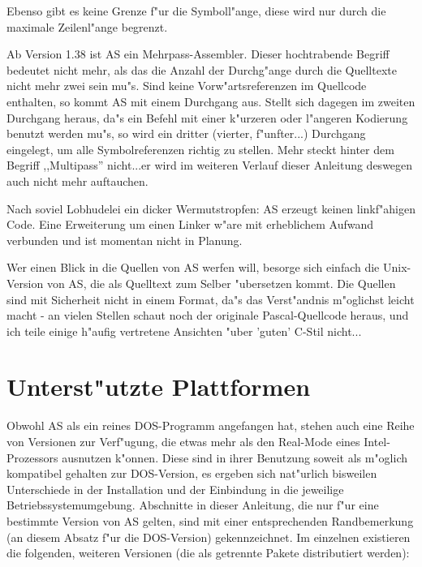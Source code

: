 \documentclass[12pt,a4paper,twoside]{report}
\begin{document}
Ebenso gibt es keine Grenze f"ur die Symboll"ange, diese wird nur durch
die maximale Zeilenl"ange begrenzt.
\par
Ab Version 1.38 ist AS ein Mehrpass-Assembler.  Dieser hochtrabende Begriff
bedeutet nicht mehr, als das die Anzahl der Durchg"ange durch die Quelltexte
nicht mehr zwei sein mu"s.  Sind keine Vorw"artsreferenzen im Quellcode
enthalten, so kommt AS mit einem Durchgang aus.  Stellt sich dagegen im zweiten
Durchgang heraus, da"s ein Befehl mit einer k"urzeren oder l"angeren Kodierung
benutzt werden mu"s, so wird ein dritter (vierter, f"unfter...) Durchgang
eingelegt, um alle Symbolreferenzen richtig zu stellen.  Mehr steckt hinter dem
Begriff ,,Multipass'' nicht...er wird im weiteren Verlauf dieser Anleitung
deswegen auch nicht mehr auftauchen.
\par
Nach soviel Lobhudelei ein dicker Wermutstropfen: AS erzeugt keinen
linkf"ahigen Code.  Eine Erweiterung um einen Linker w"are mit erheblichem
Aufwand verbunden und ist momentan nicht in Planung.
\par
Wer einen Blick in die Quellen von AS werfen will, besorge sich einfach
die Unix-Version von AS, die als Quelltext zum Selber "ubersetzen kommt.
Die Quellen sind mit Sicherheit nicht in einem Format, da"s das
Verst"andnis m"oglichst leicht macht - an vielen Stellen schaut noch
der originale Pascal-Quellcode heraus, und ich teile einige h"aufig
vertretene Ansichten "uber 'guten' C-Stil nicht...


\section{Unterst"utzte Plattformen}

Obwohl AS als ein reines DOS-Programm  angefangen
hat, stehen auch eine Reihe von Versionen zur Verf"ugung, die etwas mehr
als den Real-Mode eines Intel-Prozessors ausnutzen k"onnen.  Diese sind in
ihrer Benutzung soweit als m"oglich kompatibel gehalten zur DOS-Version,
es ergeben sich nat"urlich bisweilen Unterschiede in der Installation und
der Einbindung in die jeweilige Betriebssystemumgebung.  Abschnitte in
dieser Anleitung, die nur f"ur eine bestimmte Version von AS gelten, sind
mit einer entsprechenden Randbemerkung (an diesem Absatz f"ur die
DOS-Version) gekennzeichnet.  Im einzelnen existieren die folgenden,
weiteren Versionen (die als getrennte Pakete distributiert werden):
\end{document}
